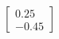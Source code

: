 \documentclass[preview]{standalone}
\begin{document}
\begin{align*}
\begin{bmatrix} 0.25 \\ -0.45 \end{bmatrix}
\end{align*}
\end{document}
